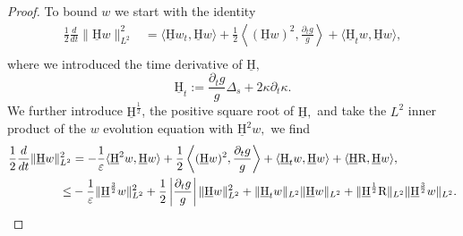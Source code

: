 \documentclass[11pt]{amsart}
\theoremstyle{plain}
\newcommand{\beq}{\begin{equation}}
\newcommand{\eeq}{\end{equation}}
\def\mrH{\textrm H}
\def\mrR{\textrm R}
\def\mrH{\underline{\mathrm{H}}}
\def\eps{\varepsilon}
\numberwithin{equation}{section}
\theoremstyle{plain}
\begin{document}
\begin{proof}
To bound $w$ we start with the identity
\beq\label{e:TV_mist}
\begin{aligned}
\frac12 \frac{d}{dt} \|\mrH w\|_{L^2}^2 &= \langle \mrH w_t,\mrH w\rangle + \frac{1}{2}\left \langle (\mrH w)^2,\frac {\partial_t g}{g} \right\rangle+\langle \mrH_t w,\mrH w\rangle,\\
\end{aligned}
\eeq
where we introduced the time derivative of $\mrH,$
\beq\label{e:Ht-def}
    \mrH_t := \frac {\partial_t g}{g} \Delta_s +2\kappa\partial_t \kappa.
\eeq
We further introduce $\mrH^{\frac12}$, the positive square root of $\mrH,$ and take the $L^2$ inner product of the $w$ evolution equation with $\mrH^2 w,$ we find
\beq
\label{e:w_Eng_est}
\begin{aligned}
\frac12\frac{d}{dt}\|\mrH w\|_{L^2}^2 &= -\frac{1}{\eps}\langle \mrH^2 w, \mrH w\rangle +
\frac{1}{2}\left \langle (\mrH w)^2,\frac {\partial_t g}{g} \right\rangle+\langle \mrH_t w,\mrH w\rangle+\langle \mrH \mrR, \mrH w\rangle,\\
\leq& -\frac{1}{\eps} \|\mrH^\frac32 w\|_{L^2}^2+\frac12 \left|\frac{\partial_t g}{g}\right|\|\mrH w\|_{L^2}^2 +\|\mrH_t w\|_{L^2}\|\mrH w\|_{L^2}+\|\mrH^\frac12\mrR\|_{L^2} \|\mrH^\frac32 w\|_{L^2}.
\end{aligned}
\eeq


\end{proof}
\end{document}
